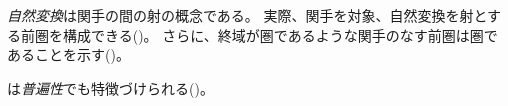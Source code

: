 \documentclass[index]{subfiles}
\begin{document}

\emph{自然変換}は関手の間の射の概念である。
実際、関手を対象、自然変換を射とする前圏を構成できる()。
さらに、終域が圏であるような関手のなす前圏は圏であることを示す()。








は\emph{普遍性}でも特徴づけられる()。



\end{document}

